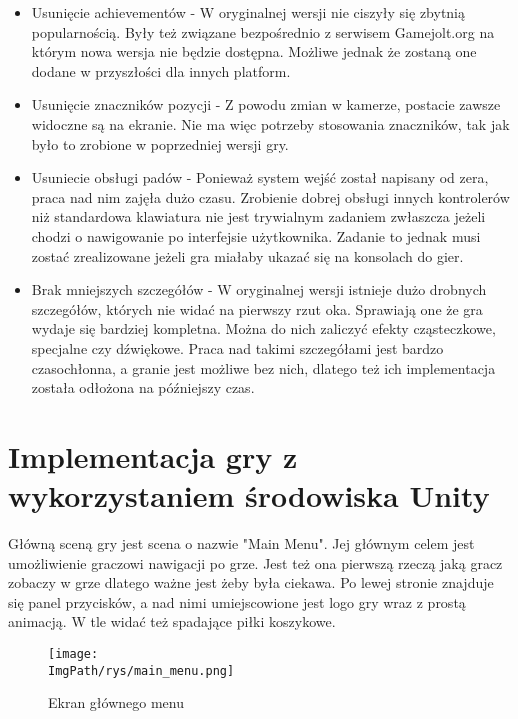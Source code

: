\documentclass[a4paper,12pt,twoside,openany]{report}
\newcommand{\ImgPath}{.}
\begin{document}
\begin{itemize}
    \item Usunięcie achievementów - W oryginalnej wersji nie ciszyły się zbytnią popularnością. Były też związane bezpośrednio z serwisem Gamejolt.org na którym nowa wersja nie będzie dostępna. Możliwe jednak że zostaną one dodane w przyszłości dla innych platform.
    \item Usunięcie znaczników pozycji - Z powodu zmian w kamerze, postacie zawsze widoczne są na ekranie. Nie ma więc potrzeby stosowania znaczników, tak jak było to zrobione w poprzedniej wersji gry.  
    \item Usuniecie obsługi padów - Ponieważ system wejść został napisany od zera, praca nad nim zajęła dużo czasu. Zrobienie dobrej obsługi innych kontrolerów niż standardowa klawiatura nie jest trywialnym zadaniem zwłaszcza jeżeli chodzi o nawigowanie po interfejsie użytkownika. Zadanie to jednak musi zostać zrealizowane jeżeli gra miałaby ukazać się na konsolach do gier.
    \item Brak mniejszych szczegółów - W oryginalnej wersji istnieje dużo drobnych szczegółów, których nie widać na pierwszy rzut oka. Sprawiają one że gra wydaje się bardziej kompletna. Można do nich zaliczyć efekty cząsteczkowe, specjalne czy dźwiękowe. Praca nad takimi szczegółami jest bardzo czasochłonna, a granie jest możliwe bez nich, dlatego też ich implementacja została odłożona na późniejszy czas.
\end{itemize}

\section{Implementacja gry z wykorzystaniem środowiska Unity}
Główną sceną gry jest scena o nazwie "Main Menu". Jej głównym celem jest umożliwienie graczowi nawigacji po grze. Jest też ona pierwszą rzeczą jaką gracz zobaczy w grze dlatego ważne jest żeby była ciekawa. Po lewej stronie znajduje się panel przycisków, a nad nimi umiejscowione jest logo gry wraz z prostą animacją. W tle widać też spadające piłki koszykowe.

\begin{figure}[!htbp]
	\begin{center}
\centering
\texttt{[image: \\ImgPath/rys/main\_menu.png]}
\end{center}
	\caption{Ekran głównego menu}
	\label{main_menu}
\end{figure}
\end{document}

